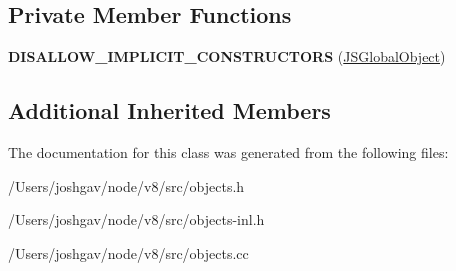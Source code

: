 \subsection*{Private Member Functions}
\begin{DoxyCompactItemize}
\item 
{\bfseries D\+I\+S\+A\+L\+L\+O\+W\+\_\+\+I\+M\+P\+L\+I\+C\+I\+T\+\_\+\+C\+O\+N\+S\+T\+R\+U\+C\+T\+O\+RS} (\hyperlink{classv8_1_1internal_1_1_j_s_global_object}{J\+S\+Global\+Object})\hypertarget{classv8_1_1internal_1_1_j_s_global_object_a7c509865904b91b1d6bf569969c62808}{}\label{classv8_1_1internal_1_1_j_s_global_object_a7c509865904b91b1d6bf569969c62808}

\end{DoxyCompactItemize}
\subsection*{Additional Inherited Members}


The documentation for this class was generated from the following files\+:\begin{DoxyCompactItemize}
\item 
/\+Users/joshgav/node/v8/src/objects.\+h\item 
/\+Users/joshgav/node/v8/src/objects-\/inl.\+h\item 
/\+Users/joshgav/node/v8/src/objects.\+cc\end{DoxyCompactItemize}
